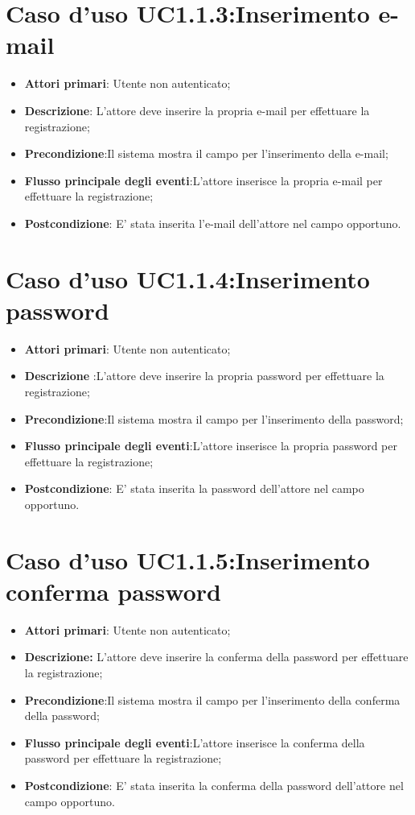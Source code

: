 {{{\section{Caso d'uso UC1.1.3:Inserimento e-mail}
	\begin{itemize}
		\item \textbf{Attori primari}: Utente non autenticato;
		\item \textbf{Descrizione}: L'attore deve inserire la propria e-mail per effettuare la  registrazione;
		\item \textbf{Precondizione}:Il sistema mostra il campo per l'inserimento della e-mail;
		\item \textbf{Flusso principale degli eventi}:L'attore inserisce la propria e-mail per effettuare la registrazione;
		\item \textbf{Postcondizione}: E' stata inserita l'e-mail dell'attore nel campo opportuno.
	\end{itemize}

\section{Caso d'uso UC1.1.4:Inserimento  password}
	\begin{itemize}
		\item \textbf{Attori primari}: Utente non autenticato;
		\item \textbf{Descrizione} :L'attore deve inserire la propria password per effettuare la registrazione;
		\item \textbf{Precondizione}:Il sistema mostra il campo per l'inserimento della password;
		\item \textbf{Flusso principale degli eventi}:L'attore inserisce la propria password per effettuare la registrazione;
		\item \textbf{Postcondizione}: E' stata inserita la password dell'attore nel campo opportuno.
	\end{itemize}

\section{Caso d'uso UC1.1.5:Inserimento  conferma password}
\begin{itemize}
	\item \textbf{Attori primari}: Utente non autenticato;
	\item \textbf{Descrizione:} L'attore deve inserire la conferma della password per effettuare la registrazione;
	\item \textbf{Precondizione}:Il sistema mostra il campo per l'inserimento della conferma della password;
	\item \textbf{Flusso principale degli eventi}:L'attore inserisce la conferma della password per effettuare la registrazione;
	\item \textbf{Postcondizione}: E' stata inserita la conferma della password dell'attore nel campo opportuno.
\end{itemize}

}}}
